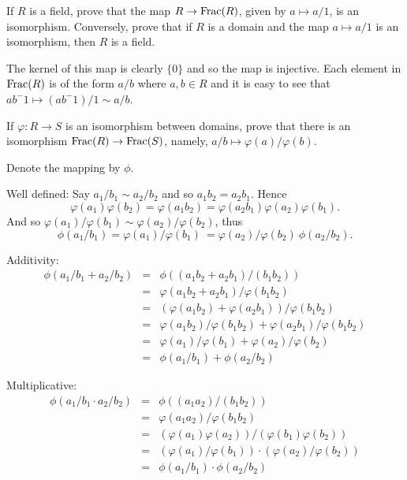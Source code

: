 \begin{myenumerate}

\item
\begin{excopy}
If $R$ is a field, prove that the map \(R\rightarrow \mathop{\rm Frac}\nolimits(R)\),
given by \(a\mapsto a/1\), is an isomorphism. Conversely, prove that
if $R$ is a domain and the map \(a\mapsto a/1\) is an isomorphism,
then $R$ is a field.
\end{excopy}

The kernel of this map is clearly \(\{0\}\) and so
the map is injective. Each element in \(\mathop{\rm Frac}\nolimits(R)\)
is of the form \(a/b\) where \(a,b\in R\) and it is easy to see
that \(ab^-1 \mapsto (ab^-1)/1 \sim a/b\).

\item
\begin{excopy}
If \(\varphi: R \rightarrow S\) is an isomorphism between domains,
prove that there is an isomorphism \(\mathop{\rm Frac}\nolimits(R)\rightarrow\mathop{\rm Frac}\nolimits(S)\),
namely, \(a/b \mapsto \varphi(a)/\varphi(b)\).
\end{excopy}

Denote the mapping by \(\phi\).

Well defined:
Say \(a_1/b_1\sim a_2/b_2\) and so \(a_1b_2=a_2b_1\).
Hence
\[ \varphi(a_1)\varphi(b_2) =
   \varphi(a_1b_2) = \varphi(a_2b_1)
   \varphi(a_2)\varphi(b_1). \]
And so \(\varphi(a_1)/\varphi(b_1) \sim \varphi(a_2)/\varphi(b_2)\),
thus
\[ \phi(a_1/b_1)
 = \varphi(a_1)/\varphi(b_1)\
 = \varphi(a_2)/\varphi(b_2)\
   \phi(a_2/b_2).\]

Additivity:
\begin{eqnarray*}
\phi(a_1/b_1 + a_2/b_2)
 & = & \phi( (a_1b_2 + a_2b_1)/(b_1b_2) ) \\
 & = & \varphi(a_1b_2 + a_2b_1)/\varphi(b_1b_2) \\
 & = & (\varphi(a_1b_2) + \varphi(a_2b_1))/\varphi(b_1b_2) \\
 & = &  \varphi(a_1b_2) / \varphi(b_1b_2)
      + \varphi(a_2b_1) / \varphi(b_1b_2) \\
 & = &  \varphi(a_1) / \varphi(b_1) + \varphi(a_2) / \varphi(b_2) \\
 & = & \phi(a_1/b_1) + \phi(a_2/b_2)
\end{eqnarray*}

Multiplicative:
\begin{eqnarray*}
\phi(a_1/b_1 \cdot a_2/b_2)
 & = & \phi((a_1a_2)/(b_1b_2))\\
 & = & \varphi(a_1a_2)/\varphi(b_1b_2) \\
 & = & (\varphi(a_1)\varphi(a_2)) / (\varphi(b_1)\varphi(b_2)) \\
 & = & (\varphi(a_1)/\varphi(b_1)) \cdot (\varphi(a_2)/\varphi(b_2)) \\
 & = & \phi(a_1/b_1) \cdot \phi(a_2/b_2)
\end{eqnarray*}


\end{myenumerate}

